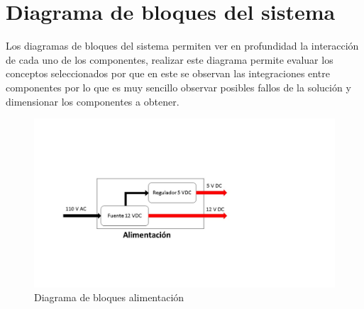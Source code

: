 \section{Diagrama de bloques del sistema}
Los diagramas de bloques del sistema permiten ver en profundidad la interacción de cada uno de los componentes, realizar este diagrama permite evaluar los conceptos seleccionados por que en este se observan las integraciones entre componentes por lo que es muy sencillo observar posibles fallos de la solución y dimensionar los componentes a obtener.
\begin{figure}[H]
	\centering
	\includegraphics[scale=0.4]{Figuras/Alimentacion}
	\caption{Diagrama de bloques alimentación}
	\label{fig:DBAlimentacion}
\end{figure}


